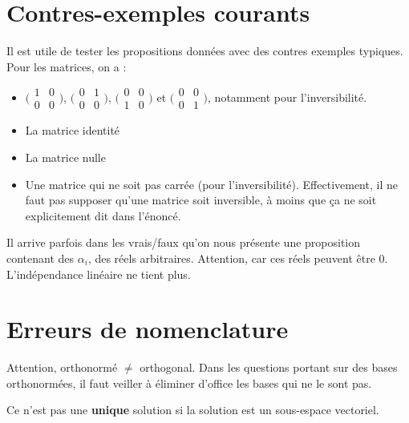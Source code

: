 \documentclass[10pt,a4paper]{book}
\begin{document}
\section{Contres-exemples courants}
Il est utile de tester les propositions données avec des contres exemples typiques. Pour les matrices, on a :
\begin{itemize}
\item $\big(\begin{smallmatrix} 
1 & 0\\
0 & 0
\end{smallmatrix}\big)$, 
$\big(\begin{smallmatrix} 
0 & 1\\
0 & 0
\end{smallmatrix}\big)$, 
$\big(\begin{smallmatrix} 
0 & 0\\
1 & 0
\end{smallmatrix}\big)$ et  
$\big(\begin{smallmatrix} 
0 & 0\\
0 & 1
\end{smallmatrix}\big)$, notamment pour l'inversibilité.
\item La matrice identité
\item La matrice nulle
\item Une matrice qui ne soit pas carrée (pour l'inversibilité). Effectivement, il ne faut pas supposer qu'une matrice soit inversible, à moins que ça ne soit explicitement dit dans l'énoncé.
\end{itemize}
Il arrive parfois dans les vrais/faux qu'on nous présente une proposition contenant des $\alpha_i$, des réels arbitraires. Attention, car ces réels peuvent être 0. L'indépendance linéaire ne tient plus.

\section{Erreurs de nomenclature}
Attention, orthonormé $\neq$ orthogonal. Dans les questions portant sur des bases orthonormées, il faut veiller à éliminer d'office les bases qui ne le sont pas.\par 
Ce n'est pas une \textbf{unique} solution si la solution est un sous-espace vectoriel.

\appendix
\end{document}
